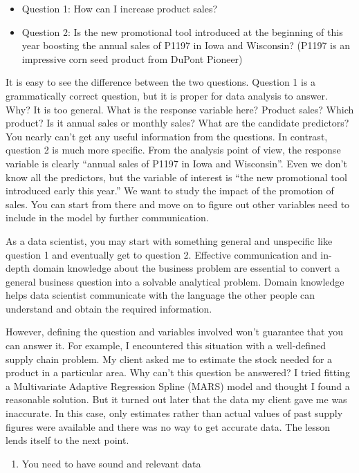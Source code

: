 \documentclass[12pt,]{krantz}
\providecommand{\tightlist}{%
  \setlength{\itemsep}{0pt}\setlength{\parskip}{0pt}}
\begin{document}
\begin{itemize}
\tightlist
\item
  Question 1: How can I increase product sales?
\item
  Question 2: Is the new promotional tool introduced at the beginning of this year boosting the annual sales of P1197 in Iowa and Wisconsin? (P1197 is an impressive corn seed product from DuPont Pioneer)
\end{itemize}

It is easy to see the difference between the two questions. Question 1 is a grammatically correct question, but it is proper for data analysis to answer. Why? It is too general. What is the response variable here? Product sales? Which product? Is it annual sales or monthly sales? What are the candidate predictors? You nearly can't get any useful information from the questions. In contrast, question 2 is much more specific. From the analysis point of view, the response variable is clearly ``annual sales of P1197 in Iowa and Wisconsin''. Even we don't know all the predictors, but the variable of interest is ``the new promotional tool introduced early this year.'' We want to study the impact of the promotion of sales. You can start from there and move on to figure out other variables need to include in the model by further communication.

As a data scientist, you may start with something general and unspecific like question 1 and eventually get to question 2. Effective communication and in-depth domain knowledge about the business problem are essential to convert a general business question into a solvable analytical problem. Domain knowledge helps data scientist communicate with the language the other people can understand and obtain the required information.

However, defining the question and variables involved won't guarantee that you can answer it. For example, I encountered this situation with a well-defined supply chain problem. My client asked me to estimate the stock needed for a product in a particular area. Why can't this question be answered? I tried fitting a Multivariate Adaptive Regression Spline (MARS) model and thought I found a reasonable solution. But it turned out later that the data my client gave me was inaccurate. In this case, only estimates rather than actual values of past supply figures were available and there was no way to get accurate data. The lesson lends itself to the next point.

\begin{enumerate}
\def\labelenumi{\arabic{enumi}.}
\setcounter{enumi}{1}
\tightlist
\item
  You need to have sound and relevant data
\end{enumerate}
\end{document}
